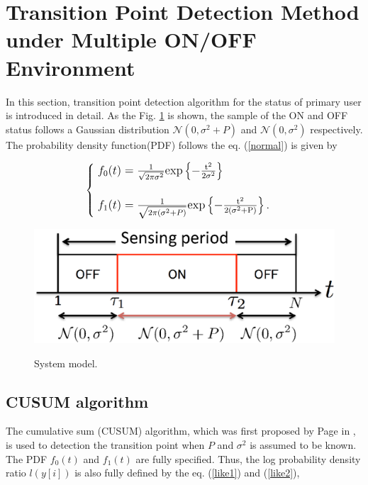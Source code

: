 \section{Transition Point Detection Method under Multiple ON/OFF Environment }    

In this section, transition point detection algorithm for the status of primary user is introduced in detail. As the Fig. \ref{system_model} is shown, the sample of the ON and OFF status follows a Gaussian distribution $\mathcal{N}(0,\sigma^2+P)$ and $\mathcal{N}(0,\sigma^2)$ respectively. The probability density function(PDF) follows the eq. (\ref{normal}) is given by

\begin{eqnarray}
{\large
\begin{cases}
\;f_0(t) = \frac{1}{\sqrt{2\pi\sigma^2}} \rm{exp}\left\{-\frac{t^2}{2\sigma^2}\right\} \\
\; \\ \nonumber
\;f_1(t) = \frac{1}{\sqrt{2\pi(\sigma^2+P)}} \rm{exp}\left\{-\frac{t^2}{2(\sigma^2+P)}\right\}.
\end{cases}
}
\label{normal}
\end{eqnarray}

\begin{center}
  \begin{figure}[t]
    \centering
    \includegraphics[width=120mm]{systemodel.eps}
    \label{system_model}
    \caption{\normalsize{System model.}}
  \end{figure}
\end{center} 

\subsection{CUSUM algorithm}
The cumulative sum (CUSUM) algorithm, which was first proposed by Page in \cite{ref:CUSUM}, is used to detection the transition point when $P$ and $\sigma^2$ is assumed to be known.
The PDF $f_0(t)$ and $f_1(t)$ are fully specified. Thus, the log probability density ratio $l(y[i])$ is also fully defined by the eq. (\ref{like1}) and (\ref{like2}),



